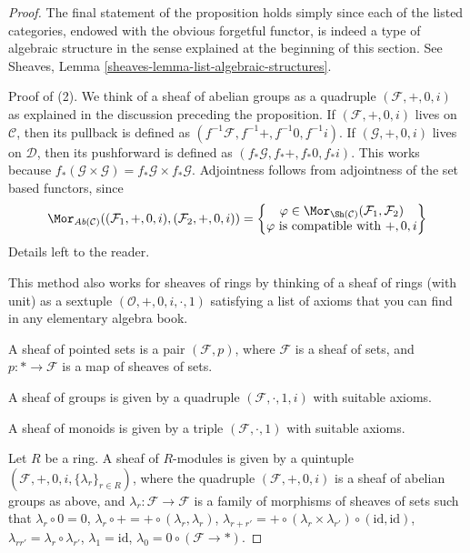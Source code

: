 \begin{proof}
The final statement of the proposition holds simply since each of the listed
categories, endowed with the obvious forgetful functor, is indeed a type of
algebraic structure in the sense explained at the beginning of this section.
See Sheaves, Lemma \ref{sheaves-lemma-list-algebraic-structures}.

\medskip\noindent
Proof of (2). We think of a sheaf of abelian groups as
a quadruple $(\mathcal{F}, +, 0, i)$ as explained in the discussion preceding
the proposition.
If $(\mathcal{F}, +, 0, i)$ lives on $\mathcal{C}$, then its pullback
is defined as $(f^{-1}\mathcal{F}, f^{-1}+, f^{-1}0, f^{-1}i)$.
If $(\mathcal{G}, +, 0, i)$ lives on $\mathcal{D}$, then its pushforward
is defined as $(f_*\mathcal{G}, f_*+, f_*0, f_*i)$. This works because
$f_*(\mathcal{G} \times \mathcal{G}) = f_*\mathcal{G} \times f_*\mathcal{G}$.
Adjointness follows from adjointness of the set based functors,
since
$$
\Mor_{\textit{Ab}(\mathcal{C})}
((\mathcal{F}_1, +, 0, i), (\mathcal{F}_2, +, 0, i))
=
\left\{
\begin{matrix}
\varphi \in \Mor_{\Sh(\mathcal{C})}
(\mathcal{F}_1, \mathcal{F}_2) \\
\varphi \text{ is compatible with }+, 0, i
\end{matrix}
\right\}
$$
Details left to the reader.

\medskip\noindent
This method also works for sheaves of rings by thinking
of a sheaf of rings (with unit) as a sextuple
$(\mathcal{O}, + , 0, i, \cdot, 1)$ satisfying a list
of axioms that you can find in any elementary
algebra book.

\medskip\noindent
A sheaf of pointed sets is a pair $(\mathcal{F}, p)$, where
$\mathcal{F}$ is a sheaf of sets, and $p : * \to \mathcal{F}$
is a map of sheaves of sets.

\medskip\noindent
A sheaf of groups is given by a quadruple $(\mathcal{F}, \cdot, 1, i)$
with suitable axioms.

\medskip\noindent
A sheaf of monoids is given by a triple $(\mathcal{F}, \cdot, 1)$
with suitable axioms.

\medskip\noindent
Let $R$ be a ring. A sheaf of $R$-modules is given by
a quintuple $(\mathcal{F}, +, 0, i, \{\lambda_r\}_{r \in R})$,
where the quadruple $(\mathcal{F}, +, 0, i)$ is a sheaf of
abelian groups as above, and $\lambda_r : \mathcal{F} \to \mathcal{F}$
is a family of morphisms of sheaves of sets
such that
$\lambda_r \circ 0 = 0$,
$\lambda_r \circ + = + \circ (\lambda_r, \lambda_r)$,
$\lambda_{r + r'} =
+ \circ (\lambda_r \times \lambda_{r'}) \circ (\text{id}, \text{id})$,
$\lambda_{rr'} = \lambda_r \circ \lambda_{r'}$,
$\lambda_1 = \text{id}$, $\lambda_0 = 0 \circ (\mathcal{F} \to *)$.
\end{proof}

